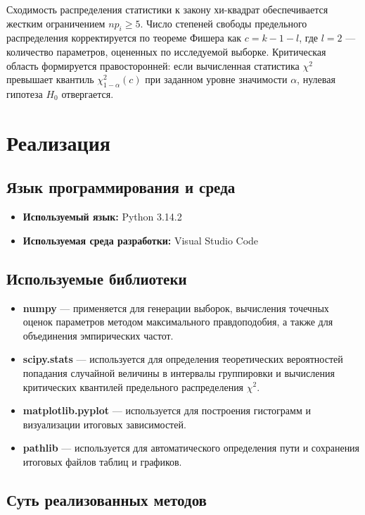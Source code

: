 \documentclass[a4paper, 14pt]{extarticle}
\begin{document}
Сходимость распределения статистики к закону хи-квадрат обеспечивается жестким ограничением $np_i \ge 5$. Число степеней свободы предельного распределения корректируется по теореме Фишера как $c = k - 1 - l$, где $l = 2$ — количество параметров, оцененных по исследуемой выборке. Критическая область формируется правосторонней: если вычисленная статистика $\chi^2$ превышает квантиль $\chi^2_{1-\alpha}(c)$ при заданном уровне значимости $\alpha$, нулевая гипотеза $H_0$ отвергается.

\section{Реализация}

\subsection{Язык программирования и среда}
\begin{itemize}
    \item \textbf{Используемый язык:} Python 3.14.2
    \item \textbf{Используемая среда разработки:} Visual Studio Code
\end{itemize}

\subsection{Используемые библиотеки}
\begin{itemize}
    \item \textbf{numpy} --- применяется для генерации выборок, вычисления точечных оценок параметров методом максимального правдоподобия, а также для объединения эмпирических частот.
    \item \textbf{scipy.stats} --- используется для определения теоретических вероятностей попадания случайной величины в интервалы группировки и вычисления критических квантилей предельного распределения $\chi^2$.
    \item \textbf{matplotlib.pyplot} --- используется для построения гистограмм и визуализации итоговых зависимостей.
    \item \textbf{pathlib} --- используется для автоматического определения пути и сохранения итоговых файлов таблиц и графиков.
\end{itemize}

\subsection{Суть реализованных методов}
\end{document}
